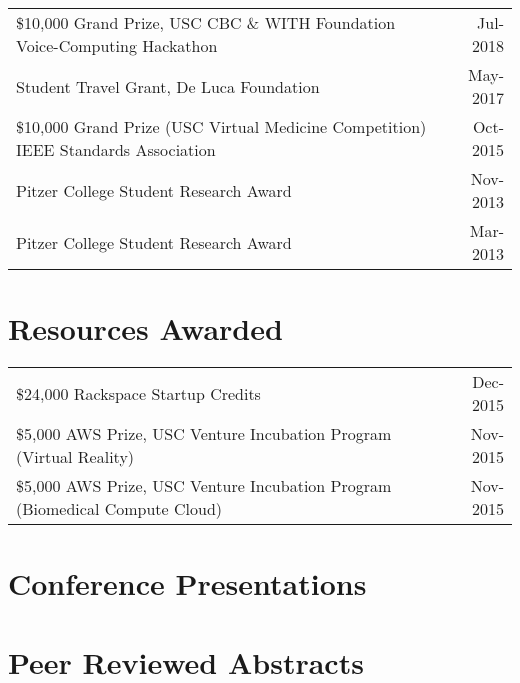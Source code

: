 \documentclass[10pt,a4paper]{article}
\begin{document}
  \vspace*{1mm}\noindent\begin{tabularx}{17cm}{X r}
  	\$10,000 Grand Prize, USC CBC \& WITH Foundation Voice-Computing Hackathon & Jul-2018\\ %
    Student Travel Grant, De Luca Foundation & May-2017\\ %
    \$10,000 Grand Prize (USC Virtual Medicine Competition) IEEE Standards Association  & Oct-2015\\ %
    Pitzer College Student Research Award & Nov-2013 \\
    Pitzer College Student Research Award & Mar-2013 \\

  \end{tabularx}

\vspace*{2mm}\section*{Resources Awarded}
  
  \vspace*{1mm}\noindent\begin{tabularx}{17cm}{X r}

    \$24,000 Rackspace Startup Credits & Dec-2015\\
    \$5,000 AWS Prize, USC Venture Incubation Program (Virtual Reality) & Nov-2015\\
    \$5,000 AWS Prize, USC Venture Incubation Program (Biomedical Compute Cloud) & Nov-2015\\

  \end{tabularx}

\newpage
  \vspace*{2mm}\section*{\textbf{Conference Presentations}}

  \vspace*{2mm}\section*{Peer Reviewed Abstracts}
\end{document}
